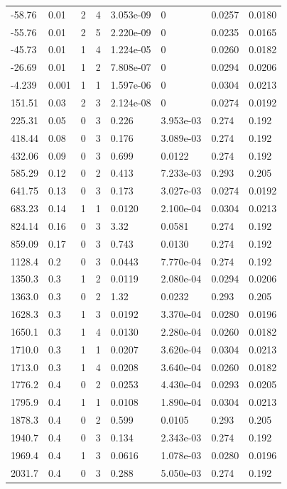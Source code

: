 \documentclass[preview]{standalone}
\begin{document}
{{\begin{tabular}{L{1.2cm}C{1.2cm} C{0.3cm}C{0.5cm} C{1.4cm}C{1.4cm} C{1.4cm}C{1.4cm}}
  -58.76  &  0.01  & 2     &  4 &  3.053e-09  & 0  & 0.0257 &  0.0180   \\ 
  -55.76  &  0.01  & 2     &  5 &  2.220e-09  & 0  & 0.0235 &  0.0165   \\ 
  -45.73  &  0.01  & 1     &  4 &  1.224e-05  & 0  & 0.0260 &  0.0182   \\ 
  -26.69  &  0.01  & 1     &  2 &  7.808e-07  & 0  & 0.0294 &  0.0206   \\ 
  -4.239  &  0.001  & 1     &  1 &  1.597e-06  & 0  & 0.0304 &  0.0213   \\ 
  151.51  &  0.03  & 2     &  3 &  2.124e-08  & 0  & 0.0274 &  0.0192   \\ 
  225.31  &  0.05  & 0     &  3 &  0.226  & 3.953e-03  & 0.274 &  0.192   \\ 
  418.44  &  0.08  & 0     &  3 &  0.176  & 3.089e-03  & 0.274 &  0.192   \\ 
  432.06  &  0.09  & 0     &  3 &  0.699  & 0.0122  & 0.274 &  0.192   \\ 
  585.29  &  0.12  & 0     &  2 &  0.413  & 7.233e-03  & 0.293 &  0.205   \\ 
  641.75  &  0.13  & 0     &  3 &  0.173  & 3.027e-03  & 0.0274 &  0.0192   \\ 
  683.23  &  0.14  & 1     &  1 &  0.0120  & 2.100e-04  & 0.0304 &  0.0213   \\ 
  824.14  &  0.16  & 0     &  3 &  3.32  & 0.0581  & 0.274 &  0.192   \\ 
  859.09  &  0.17  & 0     &  3 &  0.743  & 0.0130  & 0.274 &  0.192   \\ 
  1128.4  &   0.2  & 0     &  3 &  0.0443  & 7.770e-04  & 0.274 &  0.192   \\ 
  1350.3  &   0.3  & 1     &  2 &  0.0119  & 2.080e-04  & 0.0294 &  0.0206   \\ 
  1363.0  &   0.3  & 0     &  2 &  1.32  & 0.0232  & 0.293 &  0.205   \\ 
  1628.3  &   0.3  & 1     &  3 &  0.0192  & 3.370e-04  & 0.0280 &  0.0196   \\ 
  1650.1  &   0.3  & 1     &  4 &  0.0130  & 2.280e-04  & 0.0260 &  0.0182   \\ 
  1710.0  &   0.3  & 1     &  1 &  0.0207  & 3.620e-04  & 0.0304 &  0.0213   \\ 
  1713.0  &   0.3  & 1     &  4 &  0.0208  & 3.640e-04  & 0.0260 &  0.0182   \\ 
  1776.2  &   0.4  & 0     &  2 &  0.0253  & 4.430e-04  & 0.0293 &  0.0205   \\ 
  1795.9  &   0.4  & 1     &  1 &  0.0108  & 1.890e-04  & 0.0304 &  0.0213   \\ 
  1878.3  &   0.4  & 0     &  2 &  0.599  & 0.0105  & 0.293 &  0.205   \\ 
  1940.7  &   0.4  & 0     &  3 &  0.134  & 2.343e-03  & 0.274 &  0.192   \\ 
  1969.4  &   0.4  & 1     &  3 &  0.0616  & 1.078e-03  & 0.0280 &  0.0196   \\ 
  2031.7  &   0.4  & 0     &  3 &  0.288  & 5.050e-03  & 0.274 &  0.192   \\ 
\hline 
\end{tabular} 

}}
\end{document}
